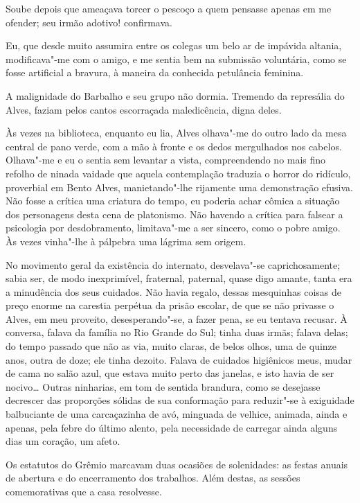 Soube depois que ameaçava torcer o pescoço a
quem pensasse apenas em me ofender; seu irmão adotivo! confirmava. 

Eu, que desde muito assumira entre os colegas um belo ar de impávida
altania, modificava"-me com o amigo, e me sentia bem na submissão
voluntária, como se fosse artificial a bravura, à maneira da conhecida
petulância feminina. 

A malignidade do Barbalho e seu grupo não dormia.
Tremendo da represália do Alves, faziam pelos cantos escorraçada
maledicência, digna deles. 


Às vezes na biblioteca, enquanto eu lia,
Alves olhava"-me do outro lado da mesa central de pano verde, com a
mão à fronte e os dedos mergulhados nos cabelos. Olhava"-me e eu o
sentia sem levantar a vista, compreendendo no mais fino refolho de
ninada vaidade que aquela contemplação traduzia o horror do ridículo,
proverbial em Bento Alves, manietando"-lhe rijamente uma demonstração
efusiva. Não fosse a crítica uma criatura do tempo, eu poderia achar
cômica a situação dos personagens desta cena de platonismo. Não havendo
a crítica para falsear a psicologia por desdobramento, limitava"-me a
ser sincero, como o pobre amigo. Às vezes vinha"-lhe à pálpebra uma
lágrima sem origem. 

No movimento geral da existência do internato,
desvelava"-se caprichosamente; sabia ser, de modo inexprimível,
fraternal, paternal, quase digo amante, tanta era a minudência dos seus
cuidados. Não havia regalo, dessas mesquinhas coisas de preço enorme na
carestia perpétua da prisão escolar, de que se não privasse o Alves, em
meu proveito, desesperando"-se, a fazer pena, se eu tentava recusar. À
conversa, falava da família no Rio Grande do Sul; tinha duas irmãs;
falava delas; do tempo passado que não as via, muito claras, de belos olhos, 
uma de quinze anos, outra de doze; ele tinha dezoito. Falava de cuidados higiênicos
meus, mudar de cama no salão azul, que estava muito perto das janelas,
e isto havia de ser nocivo\ldots{} Outras ninharias, em tom de sentida
brandura, como se desejasse decrescer das proporções sólidas de sua
conformação para reduzir"-se à exiguidade balbuciante de uma
carcaçazinha de avó, minguada de velhice, animada, ainda e apenas, pela
febre do último alento, pela necessidade de carregar ainda alguns dias
um coração, um afeto. 

Os estatutos do Grêmio marcavam duas ocasiões de
solenidades: as festas anuais de abertura e do encerramento dos
trabalhos. Além destas, as sessões comemorativas que a casa resolvesse.


